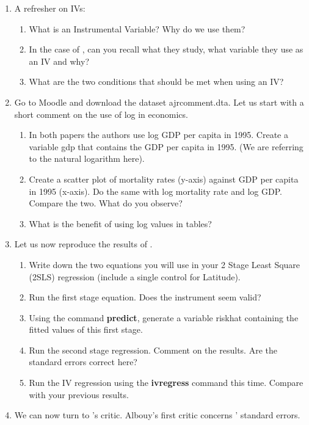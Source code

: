 \documentclass[11pt, a4paper]{article} %
\begin{document}
\begin{enumerate}
    \item A refresher on IVs:
        \begin{enumerate}
            \item What is an Instrumental Variable? Why do we use them?
            \item In the case of \citet{acemoglu2001colonial}, can you recall what they study, what variable they use as an IV and why? 
            \item What are the two conditions that should be met when using an IV? 
        \end{enumerate}
    \item Go to Moodle and download the dataset ajrcomment.dta. Let us start with a short comment on the use of log in economics. 
        \begin{enumerate}
            \item In both papers the authors use log GDP per capita in 1995. Create a variable gdp that contains the GDP per capita in 1995. (We are referring to the natural logarithm here). 
            \item Create a scatter plot of mortality rates (y-axis) against GDP per capita in 1995 (x-axis). Do the same with log mortality rate and log GDP. Compare the two. What do you observe? 
            \item What is the benefit of using log values in tables? 
        \end{enumerate}
    \item Let us now reproduce the results of \citet{acemoglu2001colonial}.
        \begin{enumerate}
            \item Write down the two equations you will use in your 2 Stage Least Square (2SLS) regression (include a single control for Latitude).
            \item Run the first stage equation. Does the instrument seem valid?
            \item Using the command \textbf{predict}, generate a variable riskhat containing the fitted values of this first stage. 
            \item Run the second stage regression. Comment on the results. Are the standard errors correct here? 
            \item Run the IV regression using the \textbf{ivregress} command this time. Compare with your previous results. 
        \end{enumerate}
    \item We can now turn to \citet{albouy2012colonial}'s critic. Albouy's first critic concerns \citet{acemoglu2001colonial}' standard errors.

\end{enumerate}
\end{document}
